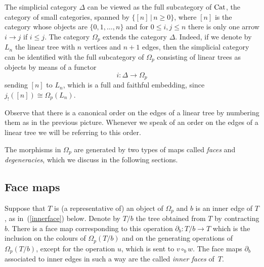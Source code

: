 \documentclass[a4paper]{amsart}
\theoremstyle{plain}
\theoremstyle{definition}
\theoremstyle{remark}
\newcommand{\rpd}{\Omega_p}
\newcommand{\To}{\longrightarrow}
\numberwithin{equation}{section}
\numberwithin{figure}{section}
\begin{document}
The simplicial category $\Delta$ can be viewed as the full
subcategory of ${\rm Cat}$, the category of small categories,
spanned by $\{[n]\,|\, n\ge 0\}$, where $[n]$ is the category whose
objects are $\{0,1,\ldots, n\}$ and for $0\le i,j\le n$ there is
only one arrow $i\longrightarrow j$ if $i\le j$. The category
$\Omega_p$ extends the category $\Delta$. Indeed, if we denote by
$L_n$ the linear tree with $n$ vertices and $n+1$ edges,
then the simplicial category can be identified with the full subcategory of $\rpd$ consisting of linear trees as objects
by means of a functor
\begin{equation}
i\colon \Delta\longrightarrow \Omega_p
\label{embedding of delta}
\end{equation}
sending $[n]$ to $L_n$, which is a full and faithful embedding, since $j_!([n])\cong\Omega_p(L_n)$.

Observe that there is a canonical order on the edges of a linear tree by numbering them as in the previous picture. Whenever we speak of an order on the edges of a linear tree we will be referring to this order.


The morphisms in $\rpd$ are generated by two types of maps called \emph{faces} and
\emph{degeneracies}, which we discuss in the following sections.

\subsection{Face maps} Suppose that $T$ is (a representative of) an object of $\rpd$ and
$b$ is an inner edge of $T$, as in~(\ref{innerface}) below. Denote by $T/b$ the tree obtained from $T$ by contracting
$b$. There is a face map corresponding to this operation $\partial_b:T/b\To T$ which is the inclusion on the colours of $\Omega_p(T/b)$
and on the generating operations of $\Omega_p(T/b)$, except for the operation  $u$, which is sent to $v\circ_b w$.
The face maps $\partial_b$ associated to inner edges in such a way are the called \emph{inner faces} of~$T$.
\end{document}
